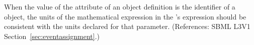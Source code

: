 When the value of the  attribute of an \EventAssignment
object definition is the identifier of a \Parameter object, the units of
the mathematical expression in the \EventAssignment's 
expression should be consistent with the units declared for that parameter.
(References: SBML L3V1 Section~\ref{sec:eventassignment}.)
